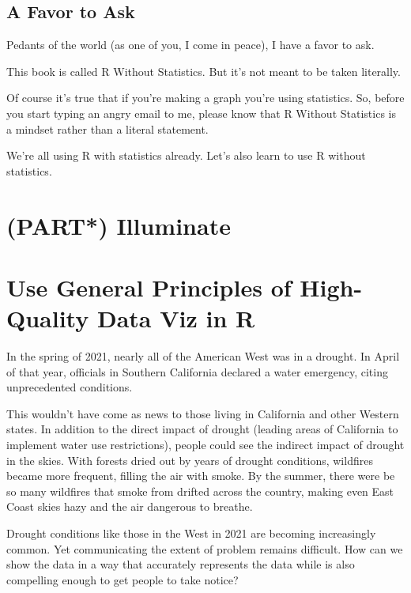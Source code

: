 \documentclass[
]{book}
\begin{document}
\hypertarget{a-favor-to-ask}{%
\section{A Favor to Ask}\label{a-favor-to-ask}}

Pedants of the world (as one of you, I come in peace), I have a favor to ask.

This book is called R Without Statistics. But it's not meant to be taken literally.

Of course it's true that if you're making a graph you're using statistics. So, before you start typing an angry email to me, please know that R Without Statistics is a mindset rather than a literal statement.

We're all using R with statistics already. Let's also learn to use R without statistics.

\hypertarget{part-illuminate}{%
\chapter{(PART*) Illuminate}\label{part-illuminate}}

\hypertarget{use-general-principles-of-high-quality-data-viz-in-r}{%
\chapter{Use General Principles of High-Quality Data Viz in R}\label{use-general-principles-of-high-quality-data-viz-in-r}}

In the spring of 2021, nearly all of the American West was in a drought. In April of that year, officials in Southern California declared a water emergency, citing unprecedented conditions.

This wouldn't have come as news to those living in California and other Western states. In addition to the direct impact of drought (leading areas of California to implement water use restrictions), people could see the indirect impact of drought in the skies. With forests dried out by years of drought conditions, wildfires became more frequent, filling the air with smoke. By the summer, there were be so many wildfires that smoke from drifted across the country, making even East Coast skies hazy and the air dangerous to breathe.

Drought conditions like those in the West in 2021 are becoming increasingly common. Yet communicating the extent of problem remains difficult. How can we show the data in a way that accurately represents the data while is also compelling enough to get people to take notice?
\end{document}
